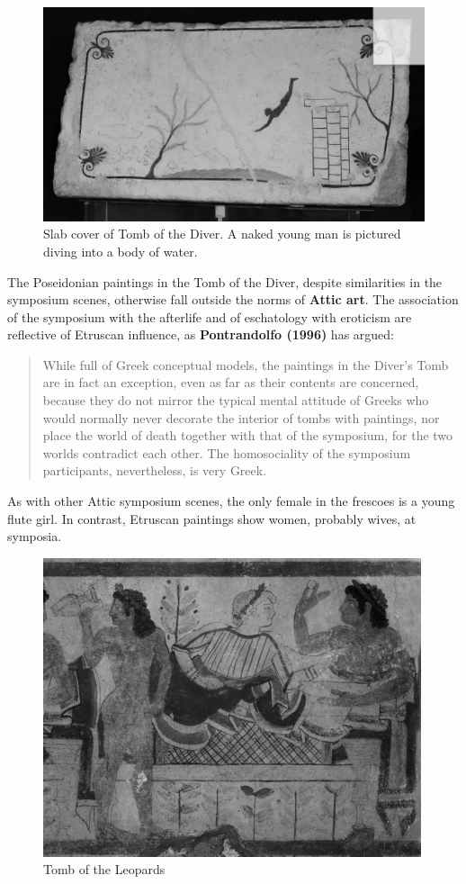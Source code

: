 \begin{figure}[H]
    \centering
    \includegraphics[scale = 0.3]{../images/Cover.PNG}
    \caption{Slab cover of Tomb of the Diver. A naked young man is pictured diving into a body of water.}
    \label{fig:slab}
\end{figure}


The Poseidonian paintings in the Tomb of the Diver, despite similarities in the symposium scenes, otherwise fall outside the norms of \textbf{Attic art}. The association of the symposium with the afterlife and of eschatology with eroticism are reflective of Etruscan influence, as \textbf{Pontrandolfo (1996)} has argued:

\begin{quotation}
    While full of Greek conceptual models, the paintings in the Diver's Tomb are in fact an exception, even as far as their contents are concerned, because they do not mirror the typical mental attitude of Greeks who would normally never decorate the interior of tombs with paintings, nor place the world of death together with that of the symposium, for the two worlds contradict each other. The homosociality of the symposium participants, nevertheless, is very Greek.
\end{quotation}

As with other Attic symposium scenes, the only female in the frescoes is a young flute girl. In contrast, Etruscan paintings show women, probably wives, at symposia.

\begin{figure}[H]
    \centering
    \includegraphics[scale = 0.3]{../images/Leopards.PNG}
    \caption{Tomb of the Leopards}
    \label{fig:leo}
\end{figure}


